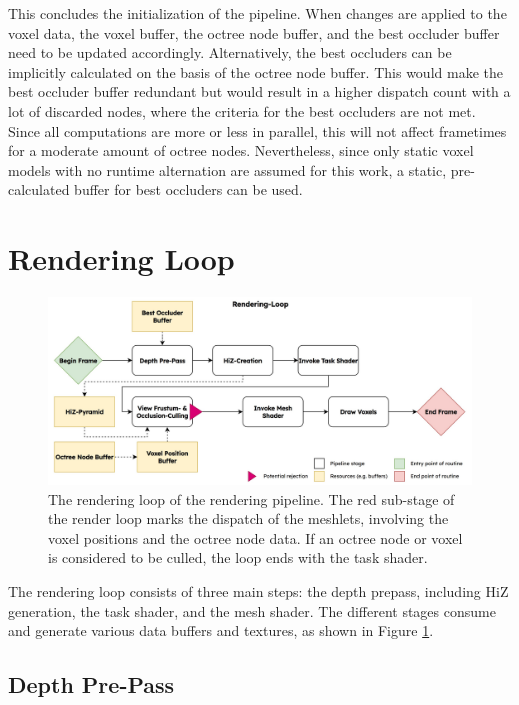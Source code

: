 \noindent
This concludes the initialization of the pipeline. When changes are applied to the voxel data, the voxel buffer,
the octree node buffer, and the best occluder buffer need to be updated accordingly. Alternatively, the best 
occluders can be implicitly calculated on the basis of the octree node buffer. This would make the best 
occluder buffer redundant but would result in a higher dispatch count with a lot of discarded nodes, 
where the criteria for the best occluders are not met. Since all computations are more or less in parallel, this 
will not affect frametimes for a moderate amount of octree nodes. Nevertheless, since only static voxel models with 
no runtime alternation are assumed for this work, a static, pre-calculated buffer for best occluders can be used.


\section{Rendering Loop} \label{sec-rendering-loop}

\begin{figure}[h]
    \centering
    \includegraphics[width=\linewidth]{images/graphics/rendering-loop.jpg}
    \caption{The rendering loop of the rendering pipeline. The red sub-stage of the render loop marks the dispatch 
    of the meshlets, involving the voxel positions and the octree node data. If an octree node or voxel is considered 
    to be culled, the loop ends with the task shader.}
    \label{fig:pipeline-loop}
\end{figure}

\noindent
The rendering loop consists of three main steps: the depth prepass, including \ac{HiZ} generation, the 
task shader, and the mesh shader. The different stages consume and generate various data buffers 
and textures, as shown in Figure \ref{fig:pipeline-loop}. 

\subsection*{Depth Pre-Pass} \label{subsec-depth-prepass}

